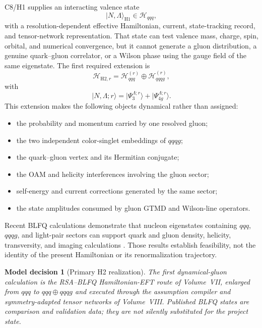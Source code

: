 \documentclass[11pt]{article}
\newtheorem{decision}[definition]{Model decision}
\newcommand{\Hil}{\mathcal H}
\newcommand{\Hthree}{\Hil_{qqq}}
\newcommand{\Hfour}{\Hil_{qqqg}}
\begin{document}
C8/H1 supplies an interacting valence state
\begin{equation}
 |N,\Lambda\rangle_{\mathrm{H1}}
 \in \Hthree,
\end{equation}
with a resolution-dependent effective Hamiltonian, current, state-tracking
record, and tensor-network representation.  That state can test valence mass,
charge, spin, orbital, and numerical convergence, but it cannot generate a
gluon distribution, a genuine quark--gluon correlator, or a Wilson phase using
the gauge field of the same eigenstate.  The first required extension is
\begin{equation}
 \Hil_{\mathrm{H2},r}
 =
 \Hthree^{(r)}\oplus\Hfour^{(r)},
 \label{eq:h2-space}
\end{equation}
with
\begin{equation}
 |N,\Lambda;r\rangle
 =
 |\Psi_{3}^{\Lambda;r}\rangle
 +
 |\Psi_{4g}^{\Lambda;r}\rangle .
 \label{eq:h2-state}
\end{equation}
This extension makes the following objects dynamical rather than assigned:
\begin{itemize}
 \item the probability and momentum carried by one resolved gluon;
 \item the two independent color-singlet embeddings of \(qqqg\);
 \item the quark--gluon vertex and its Hermitian conjugate;
 \item the OAM and helicity interferences involving the gluon sector;
 \item self-energy and current corrections generated by the same sector;
 \item the state amplitudes consumed by gluon GTMD and Wilson-line operators.
\end{itemize}
Recent BLFQ calculations demonstrate that nucleon eigenstates containing
\(qqq\), \(qqqg\), and light-pair sectors can support quark and gluon density,
helicity, transversity, and imaging calculations
\cite{Mondal2025,Vary2025}.  Those results establish feasibility, not the
identity of the present Hamiltonian or its renormalization trajectory.

\begin{decision}[Primary H2 realization]
The first dynamical-gluon calculation is the RSA--BLFQ Hamiltonian-EFT route of
Volume~VII, enlarged from \(qqq\) to \(qqq\oplus qqqg\) and executed through
the assumption compiler and symmetry-adapted tensor networks of Volume~VIII.
Published BLFQ states are comparison and validation data; they are not silently
substituted for the project state.
\end{decision}
\end{document}

